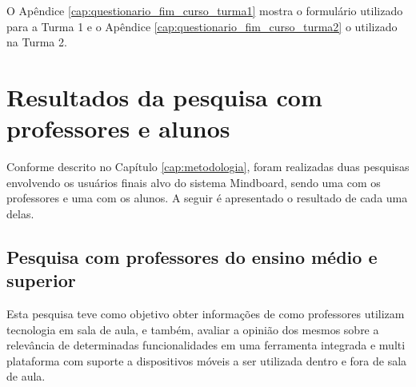 O Apêndice \ref{cap:questionario_fim_curso_turma1} mostra o formulário utilizado para a Turma 1 e o Apêndice \ref{cap:questionario_fim_curso_turma2} o utilizado na Turma 2.






\chapter{Resultados da pesquisa com professores e alunos}
\label{cap:resultados_pesquisa_professores_alunos}

Conforme descrito no Capítulo \ref{cap:metodologia}, foram realizadas duas pesquisas envolvendo os usuários finais alvo do sistema Mindboard, sendo uma com os professores e uma com os alunos. A seguir é apresentado o resultado de cada uma delas.

\section{Pesquisa com professores do ensino médio e superior}
\label{chap:pesquisa_prof}


Esta pesquisa teve como objetivo obter informações de como professores utilizam tecnologia em sala de aula, e também, avaliar a opinião dos mesmos sobre a relevância de determinadas funcionalidades em uma ferramenta integrada e multi plataforma com suporte a dispositivos móveis a ser utilizada dentro e fora de sala de aula.



